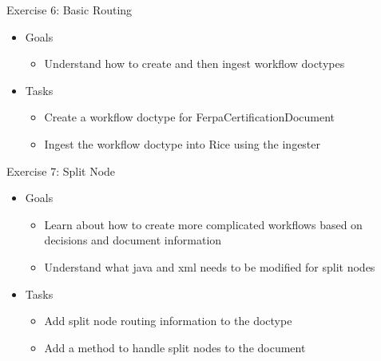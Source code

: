 \documentclass[xcolor=dvipsnames,14pt]{beamer}
\begin{document}
\begin{frame}{Exercise 6: Basic Routing}
	\begin{itemize}
		\item Goals
          \begin{itemize}
            \item Understand how to create and then ingest workflow doctypes
          \end{itemize}          
		\item Tasks
          \begin{itemize}
            \item Create a workflow doctype for FerpaCertificationDocument
            \item Ingest the workflow doctype into Rice using the ingester
          \end{itemize}          
	\end{itemize}
\end{frame}

\begin{frame}{Exercise 7: Split Node}
	\begin{itemize}
		\item Goals
          \begin{itemize}
            \item Learn about how to create more complicated workflows
              based on decisions and document information
            \item Understand what java and xml needs to be modified
              for split nodes
          \end{itemize}          
		\item Tasks
          \begin{itemize}
            \item Add split node routing information to the doctype
            \item Add a method to handle split nodes to the document
          \end{itemize}          
	\end{itemize}
\end{frame}
\end{document}

